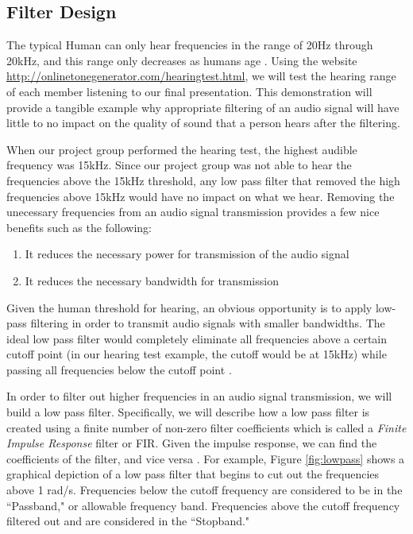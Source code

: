 \subsection{Filter Design}

The typical Human can only hear frequencies in the range of 20Hz through 20kHz, and this range only decreases as humans age  \cite{human:rg}.  Using the website \url{http://onlinetonegenerator.com/hearingtest.html}, we will test the hearing range of each member listening to our final presentation.  This demonstration will provide a tangible example why appropriate filtering of an audio signal will have little to no impact on the quality of sound that a person hears after the filtering.  

When our project group performed the hearing test, the highest audible frequency was 15kHz.  Since our project group was not able to hear the frequencies above the 15kHz threshold, any low pass filter that removed the high frequencies above 15kHz would have no impact on what we hear.  Removing the unecessary frequencies from an audio signal transmission provides a few nice benefits such as the following: 

\begin{enumerate}
\item It reduces the necessary power for transmission of the audio signal
\item It reduces the necessary bandwidth for transmission
\end{enumerate}

Given the human threshold for hearing, an obvious opportunity is to apply low-pass filtering in order to transmit audio signals with smaller bandwidths.  The ideal low pass filter would completely eliminate all frequencies above a certain cutoff point (in our hearing test example, the cutoff would be at 15kHz) while passing all frequencies below the cutoff point \cite{lowpass:wiki}.     

In order to filter out higher frequencies in an audio signal transmission, we will build a low pass filter.  Specifically, we will describe how a low pass filter is created using a finite number of non-zero filter coefficients which is called a \textit{Finite Impulse Response} filter or FIR.  Given the impulse response, we can find the coefficients of the filter, and vice versa \cite{notes:class}.  For example, Figure \ref{fig:lowpass} shows a graphical depiction of a low pass filter that begins to cut out the frequencies above 1 rad/s.  Frequencies below the cutoff frequency are considered to be in the ``Passband," or allowable frequency band.  Frequencies above the cutoff frequency filtered out and are considered in the ``Stopband."  

